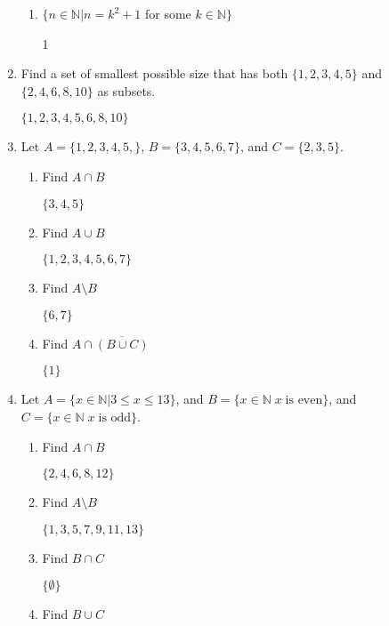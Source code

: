 \documentclass[11pt, a4paper]{article}
\newcommand\setItemNumber[1]{\setcounter{enumi}{\numexpr#1-1\relax}}
\begin{document}
\begin{enumerate}
\begin{enumerate}
            \item $\{n \in\mathbb{N}| n = k^2 +1$ for some $k\in\mathbb{N}\}$

                1

        \end{enumerate}

    \setItemNumber{5}
    \item Find a set of smallest possible size that has both $\{1,2,3,4,5\}$ and $\{2,4,6,8,10\}$ as subsets.

        $\{1,2,3,4,5,6,8,10\}$

    \setItemNumber{8}
    \item Let $A = \{1,2,3,4,5,\}$, $B = \{3,4,5,6,7\}$, and $C = \{2,3,5\}$.
        \begin{enumerate}
            \item Find $A\cap B$

                $\{3,4,5\}$

            \item Find $A\cup B$

                $\{1,2,3,4,5,6,7\}$

            \item Find $A\setminus B$

                $\{6,7\}$

            \item Find $A\cap\overline{(B\cup C)}$

                $\{1\}$

        \end{enumerate}

    \setItemNumber{10}
\item Let $A = \{x\in\mathbb{N}| 3\leq x\leq13\}$, and $B = \{x\in\mathbb{N}\; x\; \text{is even}\}$, and $C = \{x\in\mathbb{N}\;x\; \text{is odd}\}$.
        \begin{enumerate}
            \item Find $A\cap B$

                $\{2,4,6,8,12\}$

            \item Find $A\setminus B$

                $\{1,3,5,7,9,11,13\}$

            \item Find $B\cap C$

                $\{\emptyset\}$

            \item Find $B\cup C$


\end{enumerate}
\end{enumerate}
\end{document}

